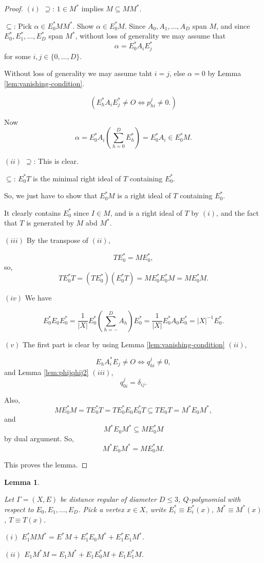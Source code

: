\documentclass[
]{book}
\newtheorem{lemma}{Lemma}[chapter]
\theoremstyle{definition}
\theoremstyle{definition}
\theoremstyle{definition}
\theoremstyle{definition}
\theoremstyle{remark}
\begin{document}
\begin{proof}
\leavevmode

\((i)\) \(\supseteq\): \(1\in M^*\) implies \(M\subseteq MM^*\).

\(\subseteq\): Pick \(\alpha\in E^*_0MM^*\). Show \(\alpha\in E^*_0M\). Since \(A_0, A_1, \ldots, A_D\) span \(M\), and since \(E^*_0, E^*_1, \ldots, E^*_D\) span \(M^*\), without loss of generality we may assume that
\[\alpha = E^*_0A_iE^*_j\]
for some \(i,j\in \{0, \ldots, D\}\).

Without loss of generality we may assume taht \(i = j\), else \(\alpha = 0\) by Lemma \ref{lem:vanishing-condition}.

\[(E^*_hA_iE^*_j \neq O \Leftrightarrow p^j_{hi}\neq 0.)\]

Now
\[\alpha = E^*_0A_i\left(\sum_{h=0}^D E^*_h\right) = E^*_0A_i \in E^*_0M.\]

\((ii)\) \(\supseteq\): This is clear.

\(\subseteq\): \(E^*_0T\) is the minimal right ideal of \(T\) containing \(E^*_0\).

So, we just have to show that \(E^*_0M\) is a right ideal of \(T\) containing \(E^*_0\).

It clearly contains \(E^*_0\) since \(I\in M\), and is a right ideal of \(T\) by \((i)\), and the fact that \(T\) is generated by \(M\) abd \(M^*\).

\((iii)\) By the transpose of \((ii)\),

\[TE^*_0 = ME^*_0,\]
so,
\[TE^*_0T = (TE^*_0)(E^*_0T) = ME^*_0E^*_0M = ME^*_0M.\]

\((iv)\) We have

\[E^*_0E_0E^*_0 = \frac{1}{|X|}E^*_0\left(\sum_{h=-}^D A_h\right)E^*_0 = \frac{1}{|X|}E^*_0A_0E^*_0 = |X|^{-1}E^*_0.\]

\((v)\) The first part is clear by using Lemma \ref{lem:vanishing-condition} \((ii)\),

\[E_hA^*_iE_j\neq O \Leftrightarrow q^j_{hi} \neq 0,\]
and Lemma \ref{lem:phijqhij2} \((iii)\),
\[q^j_{0i} = \delta_{ij}.\]

Also,
\[ME^*_0M = TE^*_0T = TE^*_0E_0E^*_0T \subseteq TE_0T = M^*E_0M^*,\]
and
\[M^*E_0M^* \subseteq ME^*_0M\]
by dual argument.
So,
\[M^*E_0M^* = ME^*_0M.\]

This proves the lemma.

\end{proof}

\begin{lemma}
\protect\hypertarget{lem:eonemmstar}{}\label{lem:eonemmstar}

Let \(\Gamma = (X, E)\) be distance regular of diameter \(D\leq 3\), \(Q\)-polynomial with respect to \(E_0, E_1, \ldots, E_D\). Pick a vertex \(x\in X\),
write \(E^*_i\equiv E^*_i(x)\), \(M^* \equiv M^*(x)\), \(T\equiv T(x)\).

\((i)\) \(E^*_1MM^* = E^*M + E^*_1E_0M^* + E^*_1E_1M^*\).

\((ii)\) \(E_1M^*M = E_1M^* + E_1E^*_0M + E_1E^*_1M\).

\end{lemma}
\end{document}
